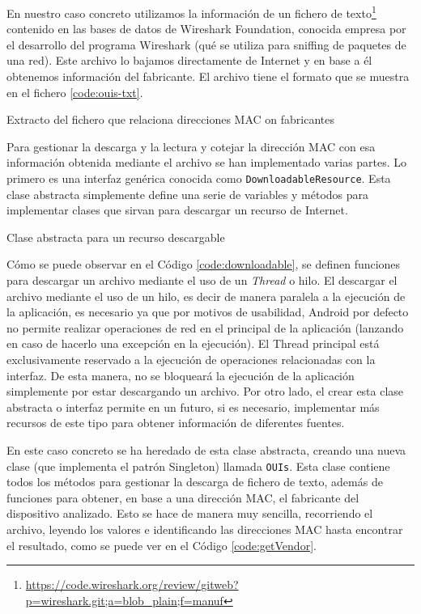 En nuestro caso concreto utilizamos la información de un fichero de texto\footnote{\url{https://code.wireshark.org/review/gitweb?p=wireshark.git;a=blob_plain;f=manuf}} contenido en las bases de datos de Wireshark Foundation, conocida empresa por el desarrollo del programa Wireshark (qué se utiliza para sniffing de paquetes de una red). Este archivo lo bajamos directamente de Internet y en base a él obtenemos información del fabricante. El archivo tiene el formato que se muestra en el fichero \ref{code:ouis-txt}. 

\begin{code}
	\caption{Extracto del fichero que relaciona direcciones MAC on fabricantes}
	\label{code:ouis-txt}
	
\end{code}

Para gestionar la descarga y la lectura y cotejar la dirección MAC con esa información obtenida mediante el archivo se han implementado varias partes. Lo primero es una interfaz genérica conocida como \texttt{DownloadableResource}. Esta clase abstracta simplemente define una serie de variables y métodos para implementar clases que sirvan para descargar un recurso de Internet.

\begin{code}
	\caption{Clase abstracta para un recurso descargable}
	\label{code:downloadable}
	
\end{code}

Cómo se puede observar en el Código \ref{code:downloadable}, se definen funciones para descargar un archivo mediante el uso de un \textit{Thread} o hilo. El descargar el archivo mediante el uso de un hilo, es decir de manera paralela a la ejecución de la aplicación, es necesario ya que por motivos de usabilidad, Android por defecto no permite realizar operaciones de red en el principal de la aplicación (lanzando en caso de hacerlo una excepción en la ejecución). El Thread principal está exclusivamente reservado a la ejecución de operaciones relacionadas con la interfaz. De esta manera, no se bloqueará la ejecución de la aplicación simplemente por estar descargando un archivo. 
Por otro lado, el crear esta clase abstracta o interfaz permite en un futuro, si es necesario, implementar más recursos de este tipo para obtener información de diferentes fuentes.

En este caso concreto se ha heredado de esta clase abstracta, creando una nueva clase (que implementa el patrón Singleton) llamada \texttt{OUIs}. Esta clase contiene todos los métodos para gestionar la descarga de fichero de texto, además de funciones para obtener, en base a una dirección MAC, el fabricante del dispositivo analizado. Esto se hace de manera muy sencilla, recorriendo el archivo, leyendo los valores e identificando las direcciones MAC hasta encontrar el resultado, como se puede ver en el Código \ref{code:getVendor}.


